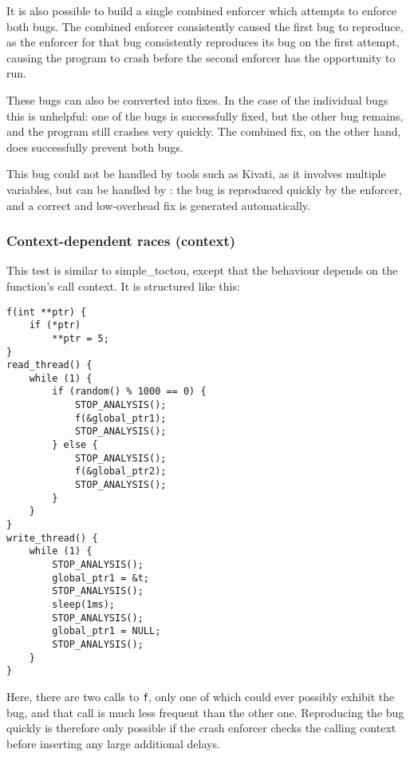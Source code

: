It is also possible to build a single combined enforcer which attempts
to enforce both bugs.  The combined enforcer consistently caused the
first bug to reproduce, as the enforcer for that bug consistently
reproduces its bug on the first attempt, causing the program to crash
before the second enforcer has the opportunity to run.

These bugs can also be converted into fixes.  In the case of the
individual bugs this is unhelpful: one of the bugs is successfully
fixed, but the other bug remains, and the program still crashes very
quickly.  The combined fix, on the other hand, does successfully
prevent both bugs.

This bug could not be handled by tools such as Kivati\needCite{}, as
it involves multiple variables, but can be handled by {\technique}:
the bug is reproduced quickly by the enforcer, and a correct and
low-overhead fix is generated automatically.


\subsubsection{Context-dependent races (context)}

This test is similar to simple\_toctou, except that the behaviour
depends on the function's call context.  It is structured like this:

\begin{verbatim}
f(int **ptr) {
    if (*ptr)
        **ptr = 5;   
}
read_thread() {
    while (1) {
        if (random() % 1000 == 0) {
            STOP_ANALYSIS();
            f(&global_ptr1);
            STOP_ANALYSIS();
        } else {
            STOP_ANALYSIS();
            f(&global_ptr2);
            STOP_ANALYSIS();
        }
    }
}        
write_thread() {
    while (1) {
        STOP_ANALYSIS();
        global_ptr1 = &t;
        STOP_ANALYSIS();
        sleep(1ms);
        STOP_ANALYSIS();
        global_ptr1 = NULL;
        STOP_ANALYSIS();
    }
}
\end{verbatim}

Here, there are two calls to \verb|f|, only one of which could ever
possibly exhibit the bug, and that call is much less frequent than the
other one.  Reproducing the bug quickly is therefore only possible if
the crash enforcer checks the calling context before inserting any
large additional delays.

